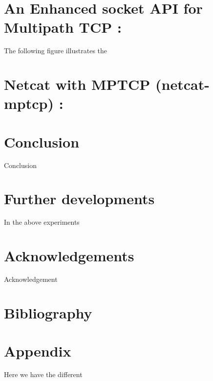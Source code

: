 \documentclass[a4paper,11pt]{article}
\begin{document}
	\clearpage
	\section{An Enhanced socket API for Multipath TCP : }

		\label{sec:mptcpapi}
		\hspace{2cm} The following figure illustrates the 

		
	\clearpage
	\section{Netcat with MPTCP (netcat-mptcp) :}

		\label{sec:netcat-mptcp}
			
			
	\clearpage
	\section{Conclusion}
		\label{sec:conclusion}
	 	Conclusion
		 	
		 
	\clearpage
	\section{Further developments}
		\label{sec:furtherdevelopment}
		In the above experiments 
			
		 	
		 	
	\clearpage
	\section{Acknowledgements}
	 
	  	Acknowledgement
		 
 	\clearpage
 	\section{Bibliography}
		
		


	\clearpage
	\section{Appendix}
	 	Here we have the different
\end{document}
